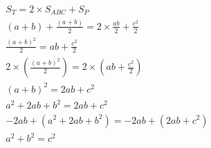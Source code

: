 $$
\begin{align}
 S_T = 2 \times S_{ABC} + S_P \tag{1} \\[1em]
(a+b) + \frac{(a+b)}{2} = 2 \times \frac{ab}{2} + \frac{c^2}{2} \tag{2} \\
\frac{(a+b)^2}{2} = ab + \frac{c^2}{2} \tag{3} \\
2 \times (\frac{(a+b)^2}{2}) = 2 \times (ab + \frac{c^2}{2}) \tag{4} \\
(a+b)^2 = 2ab + c^2 \tag{5} \\
a^2 + 2ab + b^2 = 2ab + c^2 \tag{6} \\
-2ab + (a^2 + 2ab + b^2) = -2ab + (2ab + c^2) \tag{7} \\[1em]
\boxed{a^2 + b^2 = c^2}
\end{align}
$$